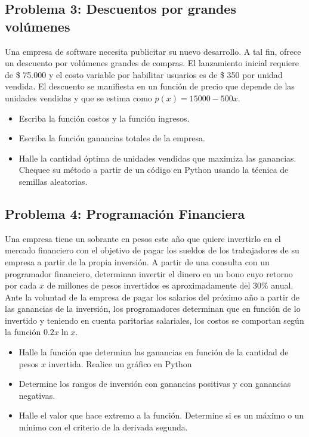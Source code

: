 \documentclass[12pt]{article}
\begin{document}
\subsection*{Problema 3: Descuentos por grandes volúmenes }

Una empresa de software necesita publicitar su nuevo desarrollo. A tal fin, ofrece un descuento por volúmenes grandes de compras. El lanzamiento inicial requiere de \$ 75.000 y el costo variable por habilitar usuarios es de \$ 350 por unidad vendida. El descuento se manifiesta en un función de precio que depende de las unidades vendidas y que se estima como $p(x) = 15000 - 500x$.
\begin{itemize}
    \item[a)] Escriba la función costos y la función ingresos.
    \item[b)] Escriba la función ganancias totales de la empresa.
    \item[c)] Halle la cantidad óptima de unidades vendidas que maximiza las ganancias. Chequee su método a partir de un código en Python usando la técnica de semillas aleatorias.
\end{itemize}

\subsection*{Problema 4: Programación Financiera}

Una empresa tiene un sobrante en pesos este año que quiere invertirlo en el mercado financiero con el objetivo de pagar los sueldos de los trabajadores de su empresa a partir de la propia inversión. A partir de una consulta con un programador financiero, determinan invertir el dinero en un bono cuyo retorno por cada $x$ de millones de pesos invertidos es aproximadamente del 30\% anual. Ante la voluntad de la empresa de pagar los salarios del próximo año a partir de las ganancias de la inversión, los programadores determinan que en función de lo invertido y teniendo en cuenta paritarias salariales, los costos se comportan según la función $0.2 x \ln x$. 
\begin{itemize}
    \item[a)] Halle la función que determina las ganancias en función de la cantidad de pesos $x$ invertida. Realice un gráfico en Python
    \item[b)] Determine los rangos de inversión con ganancias positivas y con ganancias negativas.
    \item[c)] Halle el valor que hace extremo a la función. Determine si es un máximo o un mínimo con el criterio de la derivada segunda.
\end{itemize}
\end{document}
